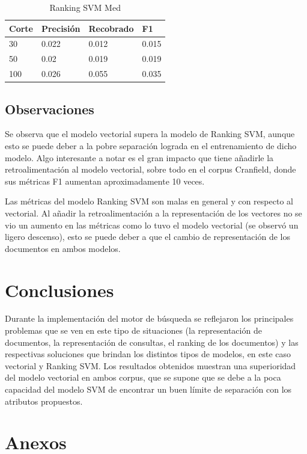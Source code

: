 \documentclass[runningheads]{llncs}
\begin{document}
\begin{table}
	\caption{Ranking SVM Med}\label{med_svm_result}
 \begin{tabular}{|l|l|l|l|}
 \hline
 	Corte &  Precisión & Recobrado & F1\\
 \hline
	30 & 0.022 & 0.012 & 0.015\\
	50 & 0.02 & 0.019 & 0.019\\
	100 & 0.026 & 0.055 & 0.035\\
 \hline
 \end{tabular}
\end{table}

\subsection{Observaciones}

Se observa que el modelo vectorial supera la modelo de Ranking SVM, aunque esto se puede deber a 
la pobre separación lograda en el entrenamiento de dicho modelo. Algo interesante a notar es el gran 
impacto que tiene añadirle la retroalimentación al modelo vectorial, sobre todo en el corpus Cranfield, 
donde sus métricas F1 aumentan aproximadamente 10 veces.

Las métricas del modelo Ranking SVM son malas en general y con respecto al vectorial. Al añadir la retroalimentación
a la representación de los vectores no se vio un aumento en las métricas como lo tuvo el modelo vectorial (se observó un
ligero descenso), esto se puede deber a que el cambio de representación de los documentos en ambos modelos.

\section{Conclusiones}

Durante la implementación del motor de búsqueda se reflejaron los principales problemas que se
ven en este tipo de situaciones (la representación de documentos, la representación de consultas, 
el ranking de los documentos) y las respectivas soluciones que brindan los distintos tipos de modelos,
en este caso vectorial y Ranking SVM. Los resultados obtenidos muestran una superioridad del modelo
vectorial en ambos corpus, que se supone que se debe a la poca capacidad del modelo SVM de encontrar
un buen límite de separación con los atributos propuestos. 

\newpage

\section{Anexos}
\end{document}
